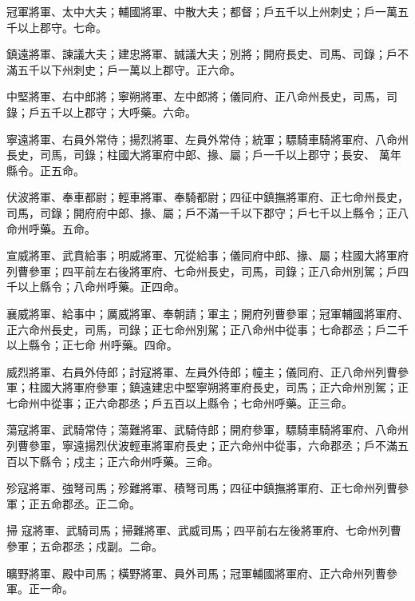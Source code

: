 \begin{pinyinscope}
 冠軍將軍、太中大夫；輔國將軍、中散大夫；都督；戶五千以上州刺史；戶一萬五千以上郡守。七命。



 鎮遠將軍、諫議大夫；建忠將軍、誠議大夫；別將；開府長史、司馬、司錄；戶不滿五千以下州刺史；戶一萬以上郡守。正六命。



 中堅將軍、右中郎將；寧朔將軍、左中郎將；儀同府、正八命州長史，司馬，司錄；戶五千以上郡守；大呼藥。六命。



 寧遠將軍、右員外常侍；揚烈將軍、左員外常侍；統軍；驃騎車騎將軍府、八命州長史，司馬，司錄；柱國大將軍府中郎、掾、屬；戶一千以上郡守；長安、
 萬年縣令。正五命。



 伏波將軍、奉車都尉；輕車將軍、奉騎都尉；四征中鎮撫將軍府、正七命州長史，司馬，司錄；開府府中郎、掾、屬；戶不滿一千以下郡守；戶七千以上縣令；正八命州呼藥。五命。



 宣威將軍、武賁給事；明威將軍、冗從給事；儀同府中郎、掾、屬；柱國大將軍府列曹參軍；四平前左右後將軍府、七命州長史，司馬，司錄；正八命州別駕；戶四千以上縣令；八命州呼藥。正四命。



 襄威將軍、給事中；厲威將軍、奉朝請；軍主；開府列曹參軍；冠軍輔國將軍府、正六命州長史，司馬，司錄；正七命州別駕；正八命州中從事；七命郡丞；戶二千以上縣令；正七命
 州呼藥。四命。



 威烈將軍、右員外侍郎；討寇將軍、左員外侍郎；幢主；儀同府、正八命州列曹參軍；柱國大將軍府參軍；鎮遠建忠中堅寧朔將軍府長史，司馬；正六命州別駕；正七命州中從事；正六命郡丞；戶五百以上縣令；七命州呼藥。正三命。



 蕩寇將軍、武騎常侍；蕩難將軍、武騎侍郎；開府參軍，驃騎車騎將軍府、八命州列曹參軍，寧遠揚烈伏波輕車將軍府長史；正六命州中從事，六命郡丞；戶不滿五百以下縣令；戍主；正六命州呼藥。三命。



 殄寇將軍、強弩司馬；殄難將軍、積弩司馬；四征中鎮撫將軍府、正七命州列曹參軍；正五命郡丞。正二命。



 掃
 寇將軍、武騎司馬；掃難將軍、武威司馬；四平前右左後將軍府、七命州列曹參軍；五命郡丞；戍副。二命。



 曠野將軍、殿中司馬；橫野將軍、員外司馬；冠軍輔國將軍府、正六命州列曹參軍。正一命。




\end{pinyinscope}
